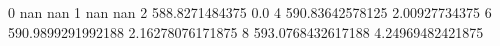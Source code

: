 0 nan nan
1 nan nan
2 588.8271484375 0.0
4 590.83642578125 2.00927734375
6 590.9899291992188 2.16278076171875
8 593.0768432617188 4.24969482421875
